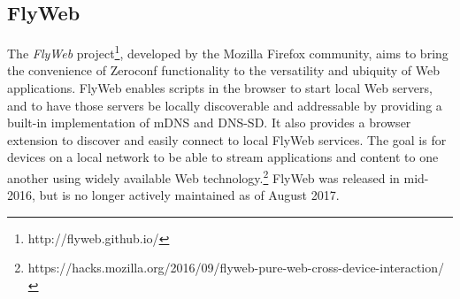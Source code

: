 \subsection{FlyWeb}
\label{sub:background_flyweb}

The \textit{FlyWeb} project\footnote{http://flyweb.github.io/}, developed by the Mozilla Firefox community, aims to bring the convenience of Zeroconf functionality to the versatility and ubiquity of Web applications.
FlyWeb enables scripts in the browser to start local Web servers, and to have those servers be locally discoverable and addressable by providing a built-in implementation of mDNS and DNS-SD.
It also provides a browser extension to discover and easily connect to local FlyWeb services.
The goal is for devices on a local network to be able to stream applications and content to one another using widely available Web technology.\footnote{https://hacks.mozilla.org/2016/09/flyweb-pure-web-cross-device-interaction/}
FlyWeb was released in mid-2016, but is no longer actively maintained as of August 2017.
